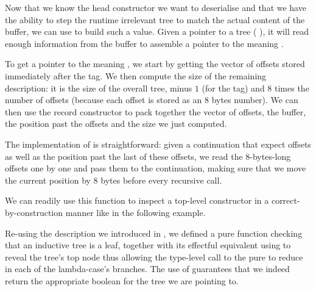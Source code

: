 Now that we know the head constructor we want to deserialise and that
we have the ability to step the runtime irrelevant tree to match the
actual content of the buffer, we can use 
to build such a value.
%
Given a pointer to a tree ( \IdrisData{\#} ),
it will read enough information from the buffer to assemble a pointer to
the meaning .


To get a pointer to the meaning ,
we start by getting the vector of offsets stored
immediately after the tag. We then compute the size of the remaining
 description: it is the size of the overall tree,
minus $1$ (for the tag) and $8$ times the number of offsets (because
each offset is stored as an 8 bytes number).
%
We can then use the record constructor  to pack
together the vector of offsets, the buffer, the position past the offsets
and the size we just computed.


The implementation of  is straightforward: given
a continuation that expect  offsets as well as the
position past the last of these offsets, we read the 8-bytes-long
offsets one by one and pass them to the continuation, making sure
that we move the current position by 8 bytes before every recursive call.

We can readily use this function to inspect a top-level
constructor in a correct-by-construction manner like in
the following example.

\noindent
\begin{minipage}[t]{.4\textwidth}
\end{minipage}\hfill\begin{minipage}[t]{.5\textwidth}
\end{minipage}

Re-using the  description we
introduced in , we defined a
pure  function checking that
an inductive tree is a leaf, together with its
effectful equivalent using 
to reveal the tree's top node thus allowing the
type-level call to the pure 
to reduce in each of the lambda-case's branches.
%
The use of  guarantees that
we indeed return the appropriate boolean for the
tree we are pointing to.

